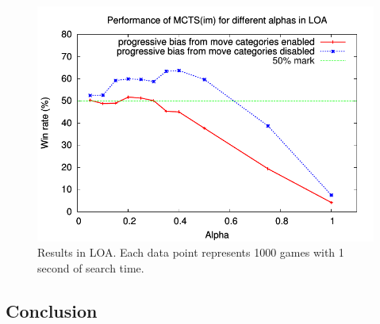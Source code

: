 \documentclass[letterpaper]{article}
\begin{document}
\begin{figure}[t]
\begin{center}
\includegraphics[scale=0.7]{plots/loa-alpha}
\caption{Results in LOA. Each data point represents 1000 games with 1 second of search time.} 
\label{fig:loa-alpha}
\end{center}
\end{figure}

\subsection{Conclusion}




\end{document}
